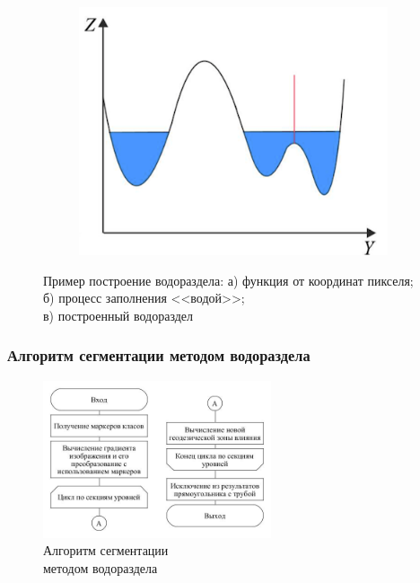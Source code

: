 \documentclass[t]{beamer}
\begin{document}
\begin{frame}
\begin{figure}[ht!]
		\begin{subfigure}{0.32\textwidth}
			\centering
			\includegraphics[width = \textwidth]{image/WaterShed3}
			\caption{}
		\end{subfigure}
		\caption{Пример построение водораздела: а) функция от координат пикселя; б) процесс заполнения <<водой>>;\\ в) построенный водораздел}
		\label{fig:WaterShed}
	\end{figure}
\end{frame}

	\begin{frame}
		\frametitle{Алгоритм сегментации методом водораздела}
		\vspace*{0.7cm}
		\begin{figure}[h!]
			\centering
			\includegraphics[width = 0.6\textwidth]{image/waterShedSegmentation}
			\caption{Алгоритм сегментации\\ методом водораздела}
			\label{fig:fullprepare}	
		\end{figure}
	\end{frame}
\end{document}

